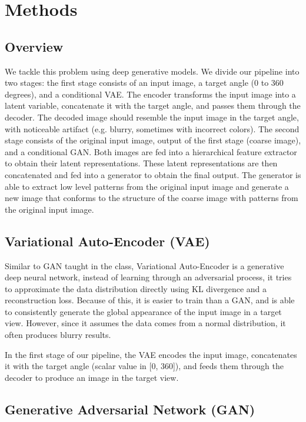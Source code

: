 \documentclass[10pt,conference]{IEEEtran}
\begin{document}
\section{Methods}

\subsection{Overview}

We tackle this problem using deep generative models. We divide our pipeline into two stages: the first stage consists of an input image, a target angle (0 to 360 degrees), and a conditional VAE. The encoder transforms the input image into a latent variable, concatenate it with the target angle, and passes them through the decoder. The decoded image should resemble the input image in the target angle, with noticeable artifact (e.g. blurry, sometimes with incorrect colors). The second stage consists of the original input image, output of the first stage (coarse image), and a conditional GAN. Both images are fed into a hierarchical feature extractor to obtain their latent representations. These latent representations are then concatenated and fed into a generator to obtain the final output. The generator is able to extract low level patterns from the original input image and generate a new image that conforms to the structure of the coarse image with patterns from the original input image.

\subsection{Variational Auto-Encoder (VAE)}

Similar to GAN taught in the class, Variational Auto-Encoder is a generative deep neural network, instead of learning through an adversarial process, it tries to approximate the data distribution directly using KL divergence and a reconstruction loss. Because of this, it is easier to train than a GAN, and is able to consistently generate the global appearance of the input image in a target view. However, since it assumes the data comes from a normal distribution, it often produces blurry results. 

In the first stage of our pipeline, the VAE encodes the input image, concatenates it with the target angle (scalar value in [0, 360]), and feeds them through the decoder to produce an image in the target view.


\subsection{Generative Adversarial Network (GAN)}
\end{document}
